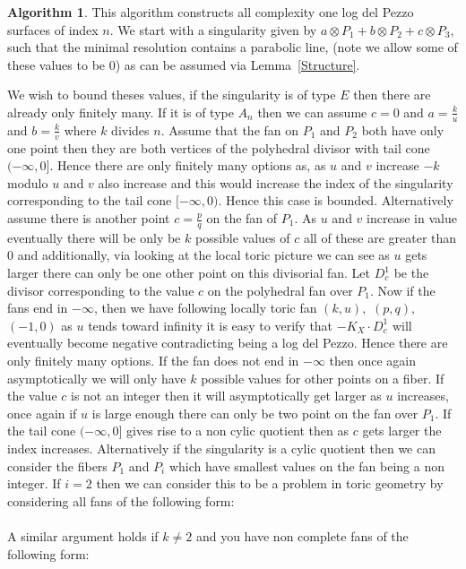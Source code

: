 \documentclass[12pt,a4paper]{book}      %
\theoremstyle{definition}
\newtheorem{algorithm}{Algorithm}
\begin{document}
\begin{algorithm}
This algorithm constructs all complexity one log del Pezzo surfaces of index $n$.
We start with a singularity given by $a \otimes P_1  + b \otimes P_2 + c \otimes P_3$, such that the minimal resolution contains a parabolic line, (note we allow some of these values to be 0) as can be assumed via Lemma~\ref{Structure}. 

We wish to bound theses values, if the singularity is of type $E$ then there are already only finitely many. If it is of type $A_n$ then we can assume $c = 0$ and $a = \frac{k}{u}$ and $b = \frac{k}{v}$ where $k$ divides $n$. Assume that the fan on $P_1$ and $P_2$ both have only one point then they are both vertices of the polyhedral divisor with tail cone $(-\infty, 0]$. Hence there are only finitely many options as, as $u$ and $v$ increase $-k$ modulo $u$ and $v$ also increase and this would increase the index of the singularity corresponding to the tail cone $[-\infty, 0)$. Hence this case is bounded. Alternatively assume there is another point $c = \frac{p}{q}$ on the fan of $P_1$. As $u$ and $v$ increase in value eventually there will be only be $k$ possible values of $c$ all of these are greater than 0 and additionally, via looking at the local toric picture we can see as $u$ gets larger there can only be one other point on this divisorial fan. Let  $D^1_{c}$ be the divisor corresponding to the value $c$ on the polyhedral fan over $P_1$. Now if the fans end in $-\infty$, then we have following locally toric fan $(k, u),$ $(p, q),$ $(-1, 0)$ as $u$ tends toward infinity it is easy to verify that $-K_X \cdot D^1_{c}$ will eventually become negative contradicting being a log del Pezzo. Hence there are only finitely many options. If the fan does not end in $-\infty$ then once again asymptotically we will only have $k$ possible values for other points on a fiber. If the value $c$ is not an integer then it will asymptotically get larger as $u$ increases, once again if $u$ is large enough there can only be two point on the fan over $P_1$. If the tail cone $(-\infty, 0]$ gives rise to a non cylic quotient then as $c$ gets larger the index increases. Alternatively if the singularity is a cylic quotient then we can consider the fibers $P_1$ and $P_i$ which have smallest values on the fan being a non integer. If $i = 2$ then we can consider this to be a problem in toric geometry by considering all fans of the following form:
\\
\\
 A similar argument holds if $k \neq 2$ and you have non complete fans of the following form:

\end{algorithm}
\end{document}
